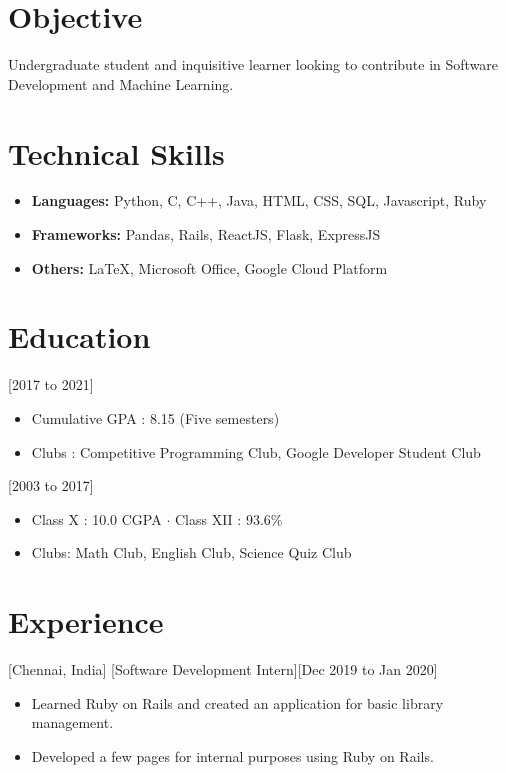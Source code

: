 \documentclass{article}
\date{Aug 2020}
\begin{document}
\makecvtitle

\section{Objective}
 Undergraduate student and inquisitive learner looking to contribute in Software Development and Machine Learning.

 
\section{Technical Skills}

\begin{itemize}
\item \textbf{Languages:} Python, C, C++, Java, HTML, CSS, SQL, Javascript, Ruby
\item \textbf{Frameworks:} Pandas, Rails, ReactJS, Flask, ExpressJS
\item \textbf{Others:} LaTeX, Microsoft Office, Google Cloud Platform
\end{itemize}


\section{Education}
[2017 to 2021]
\begin{itemize}
\item Cumulative GPA : 8.15 (Five semesters)
\item Clubs : Competitive Programming Club, Google Developer Student Club
\end{itemize}
[2003 to 2017]
\begin{itemize}
\item Class X : 10.0 CGPA $\cdot$ Class XII : 93.6\%
\item Clubs: Math Club, English Club, Science Quiz Club
\end{itemize}


 
\section{Experience}
[Chennai, India]
[Software Development Intern][Dec 2019 to Jan 2020]
\begin{itemize}
\item Learned Ruby on Rails and created an application for basic library management.
\item Developed a few pages for internal purposes using Ruby on Rails.
\end{itemize}
\end{document}
